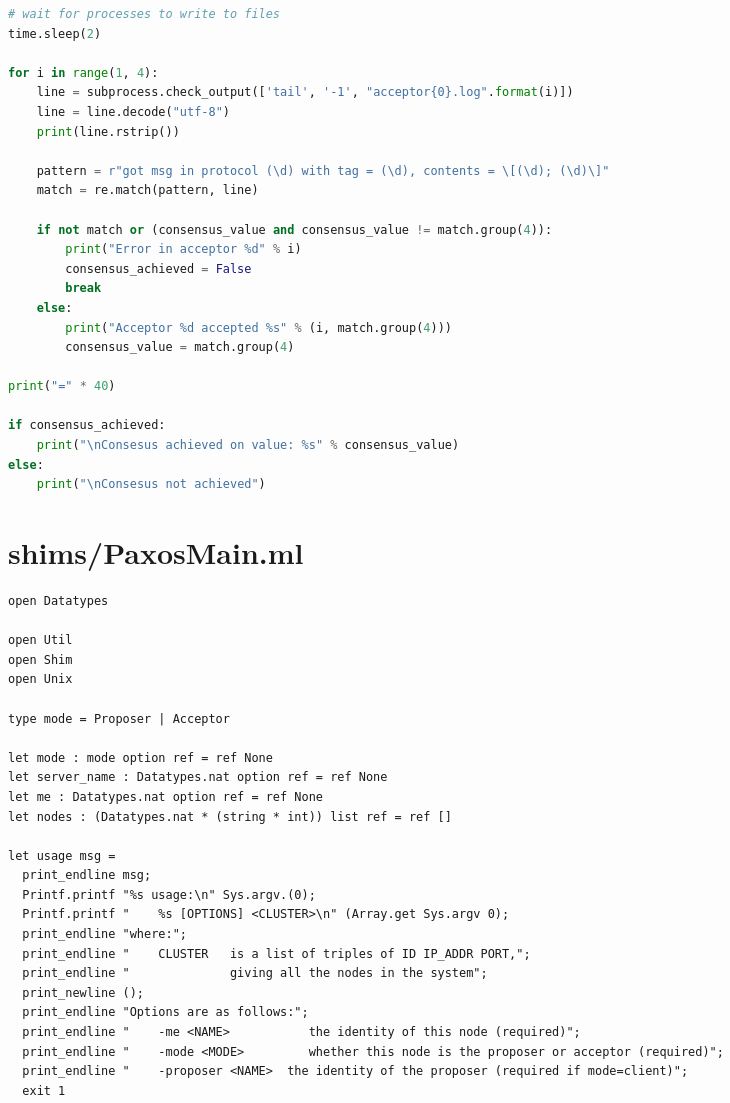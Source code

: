 \begin{landscape}
\begin{multicols*}{2}
\begin{lstlisting}[style=SourceCodeListing, language=Python]
# wait for processes to write to files
time.sleep(2)

for i in range(1, 4):
    line = subprocess.check_output(['tail', '-1', "acceptor{0}.log".format(i)])
    line = line.decode("utf-8")
    print(line.rstrip())

    pattern = r"got msg in protocol (\d) with tag = (\d), contents = \[(\d); (\d)\]"
    match = re.match(pattern, line)

    if not match or (consensus_value and consensus_value != match.group(4)):
        print("Error in acceptor %d" % i)
        consensus_achieved = False
        break
    else:
        print("Acceptor %d accepted %s" % (i, match.group(4)))
        consensus_value = match.group(4)

print("=" * 40)

if consensus_achieved:
    print("\nConsesus achieved on value: %s" % consensus_value)
else:
    print("\nConsesus not achieved")
\end{lstlisting}
\end{multicols*}

\section{shims/PaxosMain.ml}
\begin{multicols*}{2}
\begin{lstlisting}[style=SourceCodeListing]
open Datatypes

open Util
open Shim
open Unix

type mode = Proposer | Acceptor

let mode : mode option ref = ref None
let server_name : Datatypes.nat option ref = ref None
let me : Datatypes.nat option ref = ref None
let nodes : (Datatypes.nat * (string * int)) list ref = ref []

let usage msg =
  print_endline msg;
  Printf.printf "%s usage:\n" Sys.argv.(0);
  Printf.printf "    %s [OPTIONS] <CLUSTER>\n" (Array.get Sys.argv 0);
  print_endline "where:";
  print_endline "    CLUSTER   is a list of triples of ID IP_ADDR PORT,";
  print_endline "              giving all the nodes in the system";
  print_newline ();
  print_endline "Options are as follows:";
  print_endline "    -me <NAME>           the identity of this node (required)";
  print_endline "    -mode <MODE>         whether this node is the proposer or acceptor (required)";
  print_endline "    -proposer <NAME>  the identity of the proposer (required if mode=client)";
  exit 1



\end{lstlisting}
\end{multicols*}
\end{landscape}
